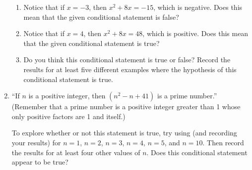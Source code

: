 \begin{prog}
\begin{enumerate}
\begin{enumerate}
\item Notice that if $x = -3$, then $x^2 + 8x = -15$, which is negative.  Does this mean that the given conditional statement is false?

\item Notice that if $x = 4$, then $x^2 + 8x = 48$, which is positive.  Does this mean that the given conditional statement is true?

\item Do you think this conditional statement is true or false?  Record the results for at least five different examples where the hypothesis of this conditional statement is true.
\end{enumerate}


\item ``If  $n$  is a positive integer, then $(n^2-n+41)$    is a prime number.''  (Remember that a prime number is a positive integer greater than 1 whose only positive factors are 1  and itself.) 
\label{PA:conditional3}%

To explore whether or not this statement is true, try using (and recording your results) for $n=1$, $n=2$, 
$n=3$, $n=4$, $n=5$, and $n=10$.  Then record the results for at least four other values of  $n$.  Does this conditional statement appear to be true? 
\end{enumerate}
\end{prog}
\hbreak

\endinput

